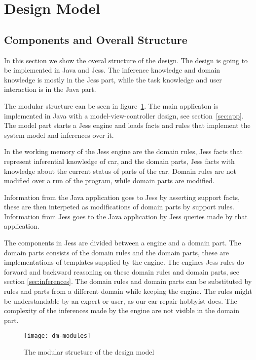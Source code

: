 \section{Design Model}

\subsection{Components and Overall Structure}
\label{sec:components}

In this section we show the overal structure of the design. The design is going
to be implemented in Java and Jess. The inference knowledge and domain knowledge
is mostly in the Jess part, while the task knowledge and user interaction is in
the Java part.

The modular structure can be seen in figure~\ref{fig:dm:modules}. The main
applicaton is implemented in Java with a model-view-controller design, see
section~\ref{sec:app}. The model part starts a Jess engine and loads facts and
rules that implement the system model and inferences over it.

In the working memory of the Jess engine are the domain rules, Jess facts
that represent inferential knowledge of car, and the domain parts, Jess facts
with knowledge about the current status of parts of the car.
Domain rules are not modified over a run of the program, while domain parts are modified. 

Information from the Java application goes to Jess by asserting support facts,
these are then interpeted as modifications of domain parts by support rules.
Information from Jess goes to the Java application by Jess queries made by that
application. 

The components in Jess are divided between a engine and a domain part. The
domain parts consists of the domain rules and the domain parts, these are implementations
of templates supplied by the engine. The engines Jess rules do forward and
backward reasoning on these domain rules and domain parts, see section \ref{sec:inferences}.
The domain rules and domain parts can be substituted by rules and parts from a
different domain while keeping the engine. The rules might be understandable by an
expert or user, as our car repair hobbyist does. The complexity of the inferences
made by the engine are not visible in the domain part.

\begin{figure}[htbp]
    \centering
    \texttt{[image: dm-modules]}
    \caption{The modular structure of the design model}
    \label{fig:dm:modules}
\end{figure}


